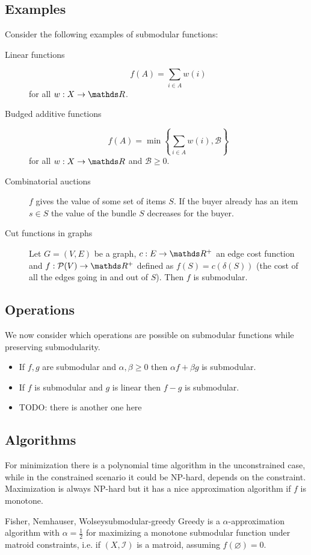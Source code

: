 \documentclass[12pt]{extarticle}
\begin{document}
\subsection{Examples}
Consider the following examples of submodular functions:
\begin{description}
	\item[Linear functions]
	      \begin{equation}
		      f(A) = \sum_{i \in A} w(i)
	      \end{equation}
	      for all $w: X \to \R$.
	\item[Budged additive functions]
	      \begin{equation}
		      f(A) = \min \left\{\sum_{i \in A} w(i), \mathcal B \right\}
	      \end{equation}
	      for all $w: X \to \R$ and $\mathcal B \geq 0$.
	\item[Combinatorial auctions] $f$ gives the value of some set of items $S$. If the buyer already
	      has an item $s \in S$ the value of the bundle $S$ decreases for the buyer.

	\item[Cut functions in graphs] Let $G = (V, E)$ be a graph, $c: E \to \R^+$ an edge cost function
	      and $f: \mathcal P(V) \to \R^+$ defined as $f(S) = c(\delta(S))$ (the cost of all the edges
	      going in and out of $S$). Then $f$ is submodular.
\end{description}

\subsection{Operations}

We now consider which operations are possible on submodular functions while preserving
submodularity.
\begin{itemize}
	\item If $f, g$ are submodular and $\alpha, \beta \geq 0$ then $\alpha f + \beta g$ is submodular.
	\item If $f$ is submodular and $g$ is linear then $f - g$ is submodular.
	\item TODO: there is another one here
\end{itemize}

\subsection{Algorithms}

For minimization there is a polynomial time algorithm in the unconstrained case, while in the
constrained scenario it could be NP-hard, depends on the constraint.
Maximization is always NP-hard but it has a nice approximation algorithm if $f$ is monotone.

\begin{theorem}{Fisher, Nemhauser, Wolsey}{submodular-greedy}
	Greedy is a $\alpha$-approximation algorithm with $\alpha = \frac{1}{2}$ for maximizing a monotone
	submodular function under matroid constraints, i.e. if $(X, \mathcal I)$ is a matroid, assuming
	$f(\varnothing) = 0$.
\end{theorem}
\end{document}
